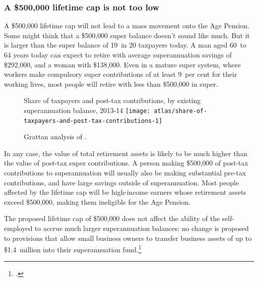 \documentclass[continuous]{grattan}\usepackage[]{graphicx}\usepackage[]{color}
\newenvironment{knitrout}{}{} %
\begin{document}
\subsubsection{A \$500,000 lifetime cap is not too low} 
A \$500,000 lifetime cap will not lead to a mass movement onto the Age Pension. 
Some might think that a \$500,000 super balance doesn’t sound like much. 
But it is larger than the super balance of 19~in 20 taxpayers today. 
A man aged 60~to 64 years today can expect to retire with average superannuation savings of \$292,000, and a woman with \$138,000. 
Even in a mature super system, where workers make compulsory super contributions of at least 9~per cent for their working lives, most people will retire with less than \$500,000 in super.%

\begin{figure}[t]
%
{Share of taxpayers and post-tax contributions, by existing superannuation balance, 2013-14}%
\begin{knitrout}
\color{fgcolor}
\texttt{[image: atlas/share-of-taxpayers-and-post-tax-contributions-1]} 

\end{knitrout}
%
{Grattan analysis of \textcite{ATO2016SampleFile1314}.}%
\end{figure}


In any case, the value of total retirement assets is likely to be much higher than the value of post-tax super contributions.
A person making \$500,000 of post-tax contributions to superannuation will usually also be making substantial pre-tax contributions, and have large savings outside of superannuation. 
%
Most people affected by the lifetime cap will be high-income earners whose retirement assets exceed \$500,000, making them ineligible for the Age Pension. 

The proposed lifetime cap of \$500,000 does not affect the ability of the self-employed to accrue much larger superannuation balances: no change is proposed to provisions that allow small business owners to transfer business assets of up to \$1.4~million into their superannuation fund.\footcite[][57]{DaleyCoatesWoodEtAl2015Super} 
\end{document}
